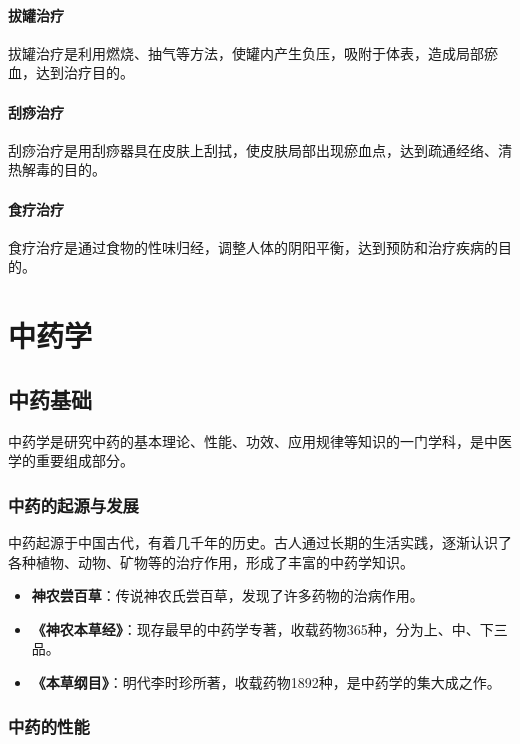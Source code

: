 \documentclass[12pt,UTF8]{ctexbook}
\begin{document}
\subsubsection{拔罐治疗}

拔罐治疗是利用燃烧、抽气等方法，使罐内产生负压，吸附于体表，造成局部瘀血，达到治疗目的。

\subsubsection{刮痧治疗}

刮痧治疗是用刮痧器具在皮肤上刮拭，使皮肤局部出现瘀血点，达到疏通经络、清热解毒的目的。

\subsubsection{食疗治疗}

食疗治疗是通过食物的性味归经，调整人体的阴阳平衡，达到预防和治疗疾病的目的。

\chapter{中药学}

\section{中药基础}

中药学是研究中药的基本理论、性能、功效、应用规律等知识的一门学科，是中医学的重要组成部分。

\subsection{中药的起源与发展}

中药起源于中国古代，有着几千年的历史。古人通过长期的生活实践，逐渐认识了各种植物、动物、矿物等的治疗作用，形成了丰富的中药学知识。

\begin{itemize}
\item \textbf{神农尝百草}：传说神农氏尝百草，发现了许多药物的治病作用。
\item \textbf{《神农本草经》}：现存最早的中药学专著，收载药物365种，分为上、中、下三品。
\item \textbf{《本草纲目》}：明代李时珍所著，收载药物1892种，是中药学的集大成之作。
\end{itemize}

\subsection{中药的性能}
\end{document}
